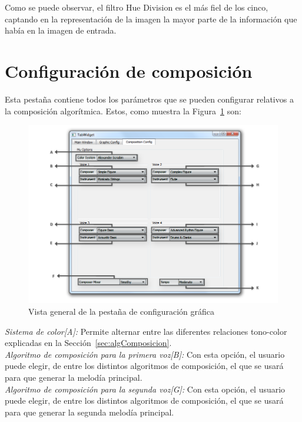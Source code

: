 		
		Como se puede observar, el filtro Hue Division es el más fiel de los cinco, captando en la representación de la imagen la mayor parte de la información que había en la imagen de entrada.

		
		\section{Configuración de composición}
		
		Esta pestaña contiene todos los parámetros que se pueden configurar relativos a la composición algorítmica. Estos, como muestra la Figura~\ref{fig:interfazcomp} son:\\
		
		\begin{figure}[htbp]
		\centering
		\hspace*{-0.6in}
		\includegraphics[scale=0.5]{graphics/interfazcomp.png}
		\caption{Vista general de la pestaña de configuración gráfica}
		\label{fig:interfazcomp}
		\end{figure}
		
		\noindent\textit{Sistema de color[A]:} Permite alternar entre las diferentes relaciones tono-color explicadas en la Sección~\ref{sec:algComposicion}.\\
		
		\noindent\textit{Algoritmo de composición para la primera voz[B]:} Con esta opción, el usuario puede elegir, de entre los distintos algoritmos de composición, el que se usará para que generar la melodía principal.\\
		
		\noindent\textit{Algoritmo de composición para la segunda voz[G]:} Con esta opción, el usuario puede elegir, de entre los distintos algoritmos de composición, el que se usará para que generar la segunda melodía principal.\\

